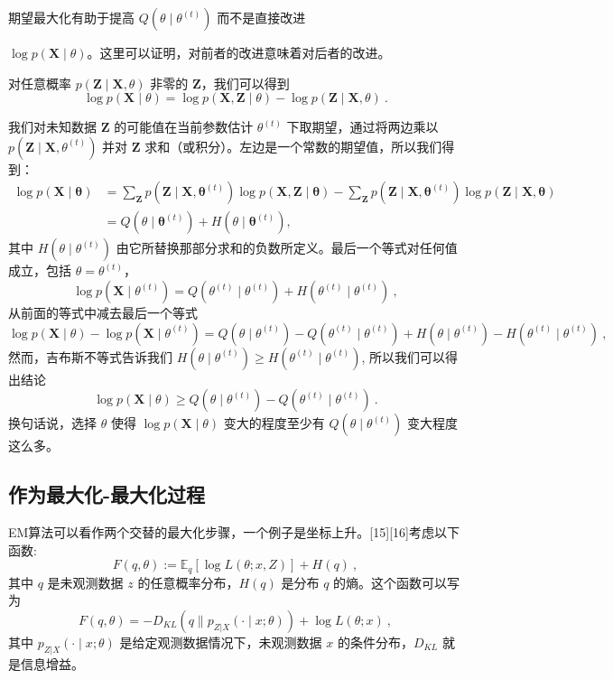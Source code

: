 期望最大化有助于提高 $Q(\theta \mid \theta^{(t)})$ 而不是直接改进 

$\log p(\mathbf{X} \mid \theta)$。这里可以证明，对前者的改进意味着对后者的改进。

对任意概率 $p(\mathbf{Z} \mid \mathbf{X}, \theta)$ 非零的 $\mathbf{Z}$，我们可以得到
$$\log p(\mathbf{X} \mid \theta) = \log p(\mathbf{X}, \mathbf{Z} \mid \theta) - \log p(\mathbf{Z} \mid \mathbf{X}, \theta)~.$$

我们对未知数据 $\mathbf{Z}$ 的可能值在当前参数估计 $\theta^{(t)}$ 下取期望，通过将两边乘以 $p(\mathbf{Z} \mid \mathbf{X}, \theta^{(t)}) $ 并对 $\mathbf{Z}$ 求和（或积分）。左边是一个常数的期望值，所以我们得到：
\begin{align}
\log p(\mathbf{X} \mid \boldsymbol{\theta}) &= \sum_{\mathbf{Z}} p(\mathbf{Z} \mid \mathbf{X}, \boldsymbol{\theta}^{(t)}) \log p(\mathbf{X}, \mathbf{Z} \mid \boldsymbol{\theta}) - \sum_{\mathbf{Z}} p(\mathbf{Z} \mid \mathbf{X}, \boldsymbol{\theta}^{(t)}) \log p(\mathbf{Z} \mid \mathbf{X}, \boldsymbol{\theta}) \\
&= Q(\theta \mid \boldsymbol{\theta}^{(t)}) + H(\theta \mid \boldsymbol{\theta}^{(t)}),~
\end{align}
其中 $H(\theta \mid \theta^{(t)})$ 由它所替换那部分求和的负数所定义。最后一个等式对任何值成立，包括 $\theta = \theta^{(t)}$，
$$\log p(\mathbf{X} \mid \theta^{(t)}) = Q(\theta^{(t)} \mid \theta^{(t)}) + H(\theta^{(t)} \mid \theta^{(t)})~,$$
从前面的等式中减去最后一个等式
$$\log p(\mathbf{X} \mid \theta) - \log p(\mathbf{X} \mid \theta^{(t)}) = Q(\theta \mid \theta^{(t)}) - Q(\theta^{(t)} \mid \theta^{(t)}) + H(\theta \mid \theta^{(t)}) - H(\theta^{(t)} \mid \theta^{(t)})~,$$
然而，吉布斯不等式告诉我们 $H(\theta \mid \theta^{(t)})\geq H(\theta^{(t)} \mid \theta^{(t)})$, 所以我们可以得出结论
$$\log p(\mathbf{X} \mid \theta) \geq Q(\theta \mid \theta^{(t)}) - Q(\theta^{(t)} \mid \theta^{(t)})~.$$
换句话说，选择 $\theta$ 使得 $\log p(\mathbf{X} \mid \theta)$ 变大的程度至少有 $Q(\theta \mid \theta^{(t)})$ 变大程度这么多。

\subsection{作为最大化-最大化过程}

EM算法可以看作两个交替的最大化步骤，一个例子是坐标上升。[15][16]考虑以下函数:
$$F(q, \theta) := \mathbb{E}_q[\log L(\theta; x, Z)] + H(q)~,$$
其中 $q$ 是未观测数据 $z$ 的任意概率分布，$H(q)$ 是分布 $q$ 的熵。这个函数可以写为
$$F(q, \theta) = -D_{KL}(q \parallel p_{Z|X}(\cdot \mid x; \theta)) + \log L(\theta; x)~,$$
其中 $p_{Z|X}(\cdot \mid x; \theta)$ 是给定观测数据情况下，未观测数据 $x$ 的条件分布，$D_{KL}$ 就是信息增益。

